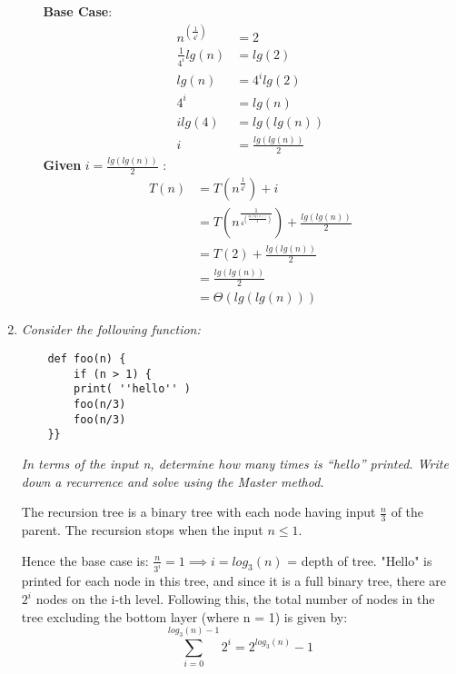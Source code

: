 \documentclass[12pt]{article} \setlength{\oddsidemargin}{0in}
\begin{document}
\begin{enumerate}
\begin{enumerate}
    \textbf{Base Case}: \\
    \begin{align}
    n^{(\frac{1}{4^i})} &= 2 \\
    \frac{1}{4^i}lg(n) &= lg(2) \\
    lg(n) &= 4^ilg(2) \\
    4^i &= lg(n) \\
    ilg(4) &= lg(lg(n)) \\
    i &= \frac{lg(lg(n))}{2}
    \end{align}
    \medskip
    \textbf{Given} $i = \frac{lg(lg(n))}{2}$ : \\
    \begin{align}
    T(n) &= T(n^{\frac{1}{4^i}}) + i \\
    &= T(n^{\frac{1}{4^{(\frac{lg(lg(n))}{2})}}}) + \frac{lg(lg(n))}{2} \\
    &= T(2) + \frac{lg(lg(n))}{2} \\
    &= \frac{lg(lg(n))}{2} \\
    &= \Theta(lg(lg(n)))
    \end{align}
    
  \end{enumerate}
  
  \newpage
  
\item \textit{Consider the following function:}
  

\begin{verbatim}
    def foo(n) {
        if (n > 1) {
        print( ''hello'' )
        foo(n/3)
        foo(n/3)
    }}
\end{verbatim}

  \textit{In terms of the input n, determine how many times is
    ``hello'' printed. Write down a recurrence and solve using the
    Master method.}

  \medskip

  The recursion tree is a binary tree with each node having input $\frac{n}{3}$ of the parent. The recursion stops when the input $n \leq 1$. 
  \medskip

  Hence the base case is: $\frac{n}{3^i} = 1 \implies i = log_3(n)$ = depth of tree. 
  "Hello" is printed for each node in this tree, and since it is a full binary tree, there are $2^i$ nodes on the i-th level.
  Following this, the total number of nodes in the tree excluding the bottom layer (where n = 1) is given by: $$\sum_{i=0}^{log_3(n)-1} 2^i = 2^{log_3(n)}-1$$

  \medskip


\end{enumerate}
\end{document}
